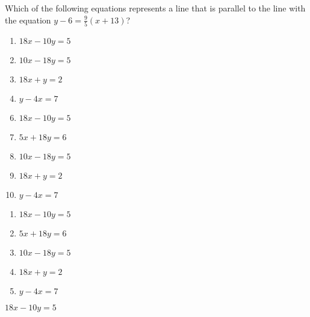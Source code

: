  
Which of the following equations represents a line that is parallel to the line with the equation $y-6=\frac{9}{5}(x+13)$?


\ifsat
	\begin{enumerate}[label=\Alph*)]
		\item $18x-10y=5 $ %
		\item $10x-18y=5 $ 
		\item $18x+y=2 $
		\item $y-4x=7 $
	\end{enumerate}
\else
\fi

\ifacteven
	\begin{enumerate}[label=\textbf{\Alph*.},itemsep=\fill,align=left]
		\setcounter{enumii}{5}
		\item $18x-10y=5 $ %
		\item $5x+18y=6 $ 
		\item $10x-18y=5 $ 
		\addtocounter{enumii}{1}
		\item $18x+y=2 $
		\item $y-4x=7 $
	\end{enumerate}
\else
\fi

\ifactodd
	\begin{enumerate}[label=\textbf{\Alph*.},itemsep=\fill,align=left]
		\item $18x-10y=5 $ %
		\item $5x+18y=6 $ 
		\item $10x-18y=5 $ 
		\item $18x+y=2 $
		\item $y-4x=7 $
	\end{enumerate}
\else
\fi

\ifgridin
 $18x-10y=5 $ %
		
\else
\fi

